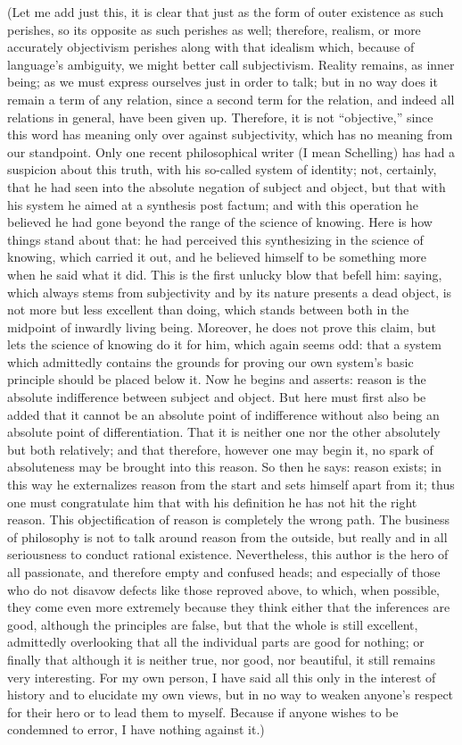 (Let me add just this,
it is clear that just as
the form of outer existence as such perishes,
so its opposite as such perishes as well;
therefore, realism, or more accurately objectivism
perishes along with that idealism which,
because of language’s ambiguity,
we might better call subjectivism.
Reality remains, as inner being;
as we must express ourselves just in order to talk;
but in no way does it remain a term of any relation,
since a second term for the relation,
and indeed all relations in general,
have been given up.
Therefore, it is not “objective,”
since this word has meaning only
over against subjectivity,
which has no meaning from our standpoint.
Only one recent philosophical writer
(I mean Schelling)
has had a suspicion about this truth,
with his so-called system of identity;
not, certainly, that he had seen into
the absolute negation of subject and object,
but that with his system he aimed
at a synthesis post factum;
and with this operation he believed
he had gone beyond the range
of the science of knowing.
Here is how things stand about that:
he had perceived this synthesizing
in the science of knowing,
which carried it out,
and he believed himself to be something more
when he said what it did.
This is the first unlucky blow that befell him:
saying, which always stems from subjectivity
and by its nature presents a dead object, is
not more but less excellent than doing,
which stands between both in
the midpoint of inwardly living being.
Moreover, he does not prove this claim,
but lets the science of knowing do it for him,
which again seems odd:
that a system which admittedly contains
the grounds for proving our own system’s
basic principle should be placed below it.
Now he begins and asserts:
reason is the absolute indifference
between subject and object.
But here must first also be added
that it cannot be an absolute point of indifference
without also being an absolute point of differentiation.
That it is neither one nor the other absolutely
but both relatively;
and that therefore, however one may begin it,
no spark of absoluteness may be brought into this reason.
So then he says: reason exists;
in this way he externalizes reason from the start
and sets himself apart from it;
thus one must congratulate him
that with his definition he has not hit the right reason.
This objectification of reason is
completely the wrong path.
The business of philosophy is not
to talk around reason from the outside,
but really and in all seriousness
to conduct rational existence.
Nevertheless, this author is
the hero of all passionate,
and therefore empty and confused heads;
and especially of those who do not disavow
defects like those reproved above,
to which, when possible,
they come even more extremely
because they think either that the inferences are good,
although the principles are false,
but that the whole is still excellent,
admittedly overlooking that all
the individual parts are good for nothing;
or finally that although it is
neither true, nor good, nor beautiful,
it still remains very interesting.
For my own person, I have said all this
only in the interest of history
and to elucidate my own views,
but in no way to weaken anyone’s respect
for their hero or to lead them to myself.
Because if anyone wishes to be condemned to error,
I have nothing against it.)

